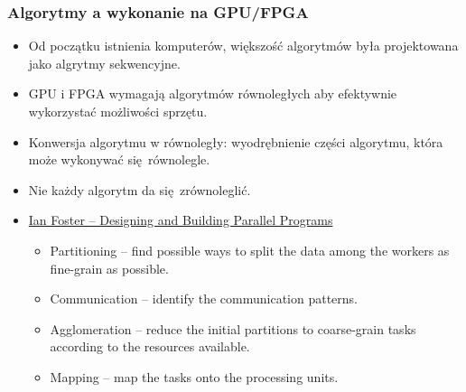 \documentclass[dvipsnames,table]{beamer}
\begin{document}
\begin{frame}
	\frametitle{Algorytmy a wykonanie na GPU/FPGA}
\begin{itemize}
	\item Od początku istnienia komputerów, większość algorytmów była projektowana jako algrytmy sekwencyjne.
	\item GPU i FPGA wymagają algorytmów równoległych aby efektywnie wykorzystać możliwości sprzętu.
	\item Konwersja algorytmu w równoległy: wyodrębnienie części algorytmu, która może wykonywać się równolegle.
	\item Nie każdy algorytm da się zrównoleglić.
	\item \href{http://www.mcs.anl.gov/~itf/dbpp/text/book.html}{Ian Foster -- Designing and Building Parallel Programs}
	\begin{itemize}
		\item Partitioning -- find possible ways to split the data among the workers as fine-grain as possible.
		\item Communication -- identify the communication patterns.
		\item Agglomeration -- reduce the initial partitions to coarse-grain tasks according to the resources available.
		\item Mapping -- map the tasks onto the processing units.
	\end{itemize}
\end{itemize}
\end{frame}

\end{document}
